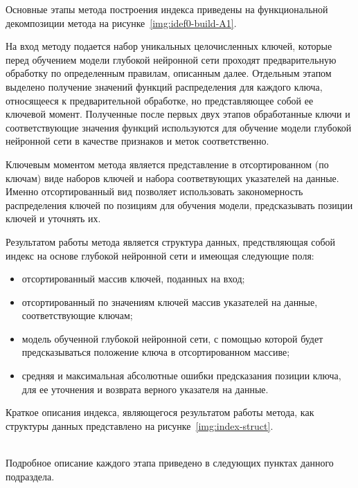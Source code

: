 Основные этапы метода построения индекса приведены на функциональной
декомпозиции метода на рисунке~\ref{img:idef0-build-A1}. 


На вход методу подается набор уникальных целочисленных ключей, которые перед
обучением модели глубокой нейронной сети проходят предварительную обработку по
определенным правилам, описанным далее. Отдельным этапом выделено получение
значений функций распределения для каждого ключа, относящееся к предварительной
обработке, но представляющее собой ее ключевой момент. Полученные после первых
двух этапов обработанные ключи и соответствующие значения функций используются
для обучение модели глубокой нейронной сети в качестве признаков и меток
соответственно.

Ключевым моментом метода является представление в отсортированном (по ключам)
виде наборов ключей и набора соответвующих указателей на данные. Именно
отсортированный вид позволяет использовать закономерность распределения ключей
по позициям для обучения модели, предсказывать позиции ключей и уточнять их.

Результатом работы метода является структура данных, предствляющая собой индекс
на основе глубокой нейронной сети и имеющая следующие поля:

\begin{itemize}
    \item отсортированный массив ключей, поданных на вход;
    \item отсортированный по значениям ключей массив указателей
        на данные, соответствующие ключам;
    \item модель обученной глубокой нейронной сети, с помощью которой будет
        предсказываться положение ключа в отсортированном массиве;
    \item средняя и максимальная абсолютные ошибки предсказания позиции ключа,
        для ее уточнения и возврата верного указателя на данные.
\end{itemize}

Краткое описания индекса, являющегося результатом работы метода, как структуры
данных представлено на рисунке~\ref{img:index-struct}.


~\\
Подробное описание каждого этапа приведено в следующих пунктах данного
подраздела.

